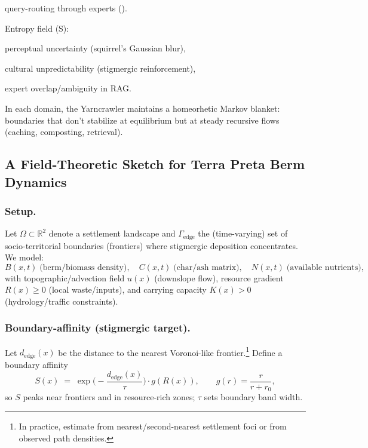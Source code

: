 \documentclass{article}
\begin{document}
query-routing through experts ().


Entropy field (S):

perceptual uncertainty (squirrel’s Gaussian blur),

cultural unpredictability (stigmergic reinforcement),

expert overlap/ambiguity in RAG.


In each domain, the Yarncrawler maintains a homeorhetic Markov blanket: boundaries that don’t stabilize at equilibrium but at steady recursive flows (caching, composting, retrieval).

\subsection{A Field-Theoretic Sketch for Terra Preta Berm Dynamics}

\subsubsection{Setup.}
Let $\Omega\subset\mathbb{R}^2$ denote a settlement landscape and $\Gamma_{\!\mathrm{edge}}$ the (time-varying) set of socio-territorial boundaries (frontiers) where stigmergic deposition concentrates. We model:
\[
B(x,t)\; \text{(berm/biomass density)},\quad
C(x,t)\; \text{(char/ash matrix)},\quad
N(x,t)\; \text{(available nutrients)},
\]
with topographic/advection field $u(x)$ (downslope flow), resource gradient $R(x)\!\ge 0$ (local waste/inputs), and carrying capacity $K(x)\!>\!0$ (hydrology/traffic constraints).

\subsubsection{Boundary-affinity (stigmergic target).}
Let $d_{\mathrm{edge}}(x)$ be the distance to the nearest Voronoi-like frontier.\footnote{In practice, estimate from nearest/second-nearest settlement foci or from observed path densities.}
Define a boundary affinity
\[
S(x)\;=\;\exp\!\Big(-\frac{d_{\mathrm{edge}}(x)}{\tau}\Big)\cdot g(R(x)),
\qquad g(r)=\frac{r}{r+r_0},
\]
so $S$ peaks near frontiers and in resource-rich zones; $\tau$ sets boundary band width.
\end{document}
